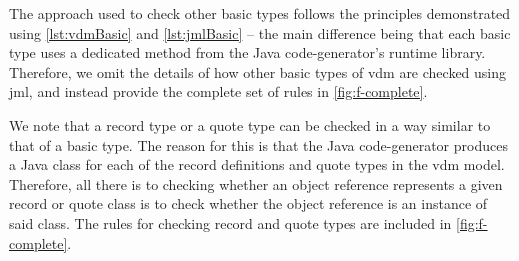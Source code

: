 The approach used to check other basic types follows the principles
demonstrated using \autoref{lst:vdmBasic} and \autoref{lst:jmlBasic}
-- the main difference being that each basic type uses a dedicated
method from the Java code-generator's runtime library. Therefore, we
omit the details of how other basic types of \ac{vdm} are checked
using \ac{jml}, and instead provide the complete set of rules in
\autoref{fig:f-complete}.

We note that a record type or a quote type can be checked in a way
similar to that of a basic type. The reason for this is that the Java
code-generator produces a Java class for each of the record definitions and
quote types in the \ac{vdm} model. Therefore, all there is to checking
whether an object reference represents a given record or quote class
is to check whether the object reference is an instance of said
class. The rules for checking record and quote types are included in
\autoref{fig:f-complete}.






